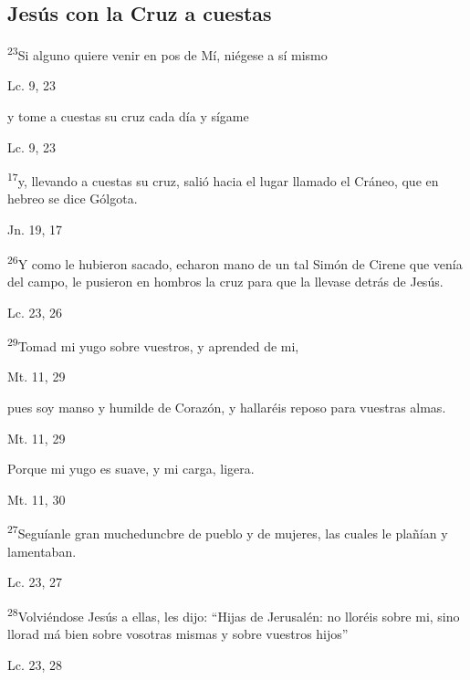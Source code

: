 \documentclass[a4paper,11pt]{article}
\begin{document}
    \subsection*{\hfil Jesús con la Cruz a cuestas \hfil}
      
      \textsuperscript{23}Si alguno quiere venir en pos de Mí, niégese a sí mismo
      \begin{center}
        Lc. 9, 23
      \end{center}

      y tome a cuestas su cruz cada día y sígame
      \begin{center}
        Lc. 9, 23
      \end{center}

      \textsuperscript{17}y, llevando a cuestas su cruz, salió hacia el lugar llamado el Cráneo, que en hebreo se dice Gólgota.
      \begin{center}
        Jn. 19, 17
      \end{center}

      \textsuperscript{26}Y como le hubieron sacado, echaron mano de un tal Simón de Cirene que venía del campo, le pusieron en hombros la cruz para que la llevase
      detrás de Jesús.
      \begin{center}
        Lc. 23, 26
      \end{center}

      \textsuperscript{29}Tomad mi yugo sobre vuestros, y aprended de mi, 
      \begin{center}
        Mt. 11, 29  
      \end{center}

      pues soy manso y humilde de Corazón, y hallaréis reposo para vuestras almas.
      \begin{center}
        Mt. 11, 29
      \end{center}

      Porque mi yugo es suave, y mi carga, ligera.
      \begin{center}
        Mt. 11, 30
      \end{center}

      \textsuperscript{27}Seguíanle gran mucheduncbre de pueblo y de mujeres, las cuales le plañían y lamentaban.
      \begin{center}
        Lc. 23, 27
      \end{center}

      \textsuperscript{28}Volviéndose Jesús a ellas, les dijo: ``Hijas de Jerusalén: no lloréis sobre mi, sino llorad má bien sobre vosotras mismas y sobre
      vuestros hijos''
      \begin{center}
        Lc. 23, 28
      \end{center}
\end{document}
